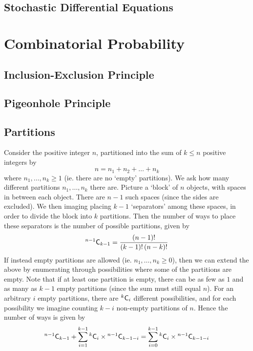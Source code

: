 \documentclass[11pt]{report} %
\begin{document}
\section{Stochastic Differential Equations}

\chapter{Combinatorial Probability}

\section{Inclusion-Exclusion Principle}

\section{Pigeonhole Principle}

\section{Partitions}

Consider the positive integer $n$, partitioned into the sum of $k \leq n$ positive integers by
\begin{equation}
n = n_{1} + n_{2} + \dots + n_{k}
\end{equation}
where $n_{1}, \dots, n_{k} \geq 1$ (ie. there are no `empty' partitions). We ask how many different partitions $n_{1}, \dots, n_{k}$ there are. Picture a `block' of $n$ objects, with spaces in between each object. There are $n - 1$ such spaces (since the sides are excluded). We then imaging placing $k - 1$ `separators' among these spaces, in order to divide the block into $k$ partitions. Then the number of ways to place these separators is the number of possible partitions, given by
\begin{equation}
\mathstrut^{n-1}\mathsf{C}_{k - 1} = \dfrac{\left(n - 1\right)!}{\left(k - 1\right)!\left(n - k\right)!}
\end{equation}
If instead empty partitions are allowed (ie. $n_{1}, \dots, n_{k} \geq 0$), then we can extend the above by enumerating through possibilities where some of the partitions are empty. Note that if at least one partition is empty, there can be as few as $1$ and as many as $k - 1$ empty partitions (since the sum must still equal $n$). For an arbitrary $i$ empty partitions, there are $\mathstrut^{k}\mathsf{C}_{i}$ different possibilities, and for each possibility we imagine counting $k - i$ non-empty partitions of $n$. Hence the number of ways is given by
\begin{equation}
\mathstrut^{n-1}\mathsf{C}_{k - 1} + \sum_{i = 1}^{k - 1}\mathstrut^{k}\mathsf{C}_{i}\times\mathstrut^{n-1}\mathsf{C}_{k - 1 - i} = \sum_{i = 0}^{k - 1}\mathstrut^{k}\mathsf{C}_{i}\times\mathstrut^{n-1}\mathsf{C}_{k - 1 - i}
\end{equation}
\end{document}
